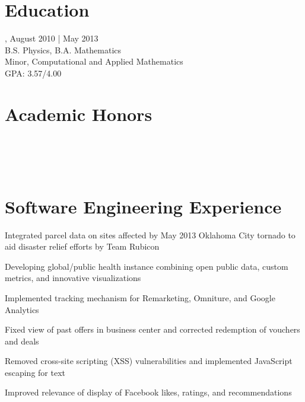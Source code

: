 \documentclass{onkursen-resume}
\begin{document}
\begin{multicols}{2}
\section*{Education}
, August 2010 | May 2013\\
B.S. Physics, B.A. Mathematics\\
Minor, Computational and Applied Mathematics\\
GPA: 3.57/4.00

\section*{Academic Honors}
\noindent
{}\\
\\
\\
\end{multicols}

\hr

\section*{Software Engineering Experience}

\begin{itemize*}
\item Integrated parcel data on sites affected by May 2013 Oklahoma City tornado to aid disaster relief efforts by Team Rubicon
\item Developing global/public health instance combining open public data, custom metrics, and innovative visualizations
\end{itemize*}

\begin{itemize*}
\item Implemented tracking mechanism for Remarketing, Omniture, and Google Analytics
\item Fixed view of past offers in business center and corrected redemption of vouchers and deals
\end{itemize*}

\begin{itemize*}
\item Removed cross-site scripting (XSS) vulnerabilities and implemented JavaScript escaping for text
\item Improved relevance of display of Facebook likes, ratings, and recommendations
\end{itemize*}
\end{document}
